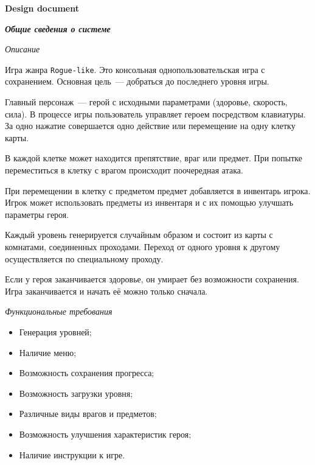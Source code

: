 \documentclass[12pt]{article}
\def\THEME{Design document}
\begin{document}
\begin{center}
{\LARGE \bf \THEME}
\end{center}

\begin{center}
\vspace*{0.1cm}
{\Large \textit{\textbf{Общие сведения о системе}}}
\end{center}

\begin{center}
\vspace*{0.1cm}
{\large \textit{Описание}}
\end{center}

Игра жанра \texttt{Rogue-like}. Это консольная однопользовательская игра с сохранением. Основная цель~--- добраться до последнего уровня игры.

Главный персонаж~--- герой с исходными параметрами (здоровье, скорость, сила). В процессе игры пользователь управляет героем посредством клавиатуры. За одно нажатие совершается одно действие или перемещение на одну клетку карты.

В каждой клетке может находится препятствие, враг или предмет. При попытке переместиться в клетку с врагом происходит поочередная атака.
 
При перемещении в клетку с предметом предмет добавляется в инвентарь игрока. Игрок может использовать предметы из инвентаря и с их помощью улучшать параметры героя.

Каждый уровень генерируется случайным образом и состоит из карты с комнатами, соединенных проходами. Переход от одного уровня к другому осуществляется по специальному проходу.

Если у героя заканчивается здоровье, он умирает без возможности сохранения. Игра заканчивается и начать её можно только сначала.
 
\begin{center}
\vspace*{0.1cm}
{\large \textit{Функциональные требования}}
\end{center}

\begin{itemize}
\item Генерация уровней;
\item Наличие меню;
\item Возможность сохранения прогресса;
\item Возможность загрузки уровня;
\item Различные виды врагов и предметов;
\item Возможность улучшения характеристик героя;
\item Наличие инструкции к игре.
\end{itemize}
\end{document}
